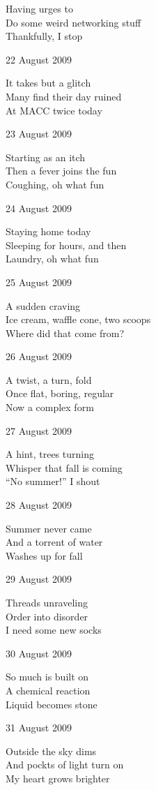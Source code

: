 \documentclass[12pt]{article}
\begin{document}
Having urges to \\
Do some weird networking stuff \\
Thankfully, I stop

22 August 2009

It takes but a glitch \\
Many find their day ruined \\
At MACC twice today

23 August 2009

Starting as an itch \\
Then a fever joins the fun \\
Coughing, oh what fun

24 August 2009

Staying home today \\
Sleeping for hours, and then \\
Laundry, oh what fun


\newpage

25 August 2009

A sudden craving \\
Ice cream, waffle cone, two scoops \\
Where did that come from?

26 August 2009

A twist, a turn, fold \\
Once flat, boring, regular \\
Now a complex form

27 August 2009

A hint, trees turning \\
Whisper that fall is coming \\
``No summer!'' I shout

28 August 2009

Summer never came \\
And a torrent of water \\
Washes up for fall

29 August 2009

Threads unraveling \\
Order into disorder \\
I need some new socks

30 August 2009

So much is built on \\
A chemical reaction \\
Liquid becomes stone

31 August 2009

Outside the sky dims \\
And pockts of light turn on \\
My heart grows brighter
\end{document}
